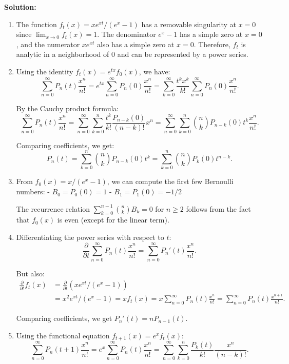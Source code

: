 \bigskip\noindent\textbf{Solution:}
\begin{enumerate}[label=(\alph*)]
\item The function \( f_t(x) = xe^{xt}/(e^x - 1) \) has a removable singularity at \( x = 0 \) since \( \lim_{x \to 0} f_t(x) = 1 \). The denominator \( e^x - 1 \) has a simple zero at \( x = 0 \), and the numerator \( xe^{xt} \) also has a simple zero at \( x = 0 \). Therefore, \( f_t \) is analytic in a neighborhood of 0 and can be represented by a power series.

\item Using the identity \( f_t(x) = e^{tx} f_0(x) \), we have:
\[\sum_{n=0}^\infty P_n(t) \frac{x^n}{n!} = e^{tx} \sum_{n=0}^\infty P_n(0) \frac{x^n}{n!} = \sum_{k=0}^\infty \frac{t^k x^k}{k!} \sum_{n=0}^\infty P_n(0) \frac{x^n}{n!}.\]

By the Cauchy product formula:
\[\sum_{n=0}^\infty P_n(t) \frac{x^n}{n!} = \sum_{n=0}^\infty \sum_{k=0}^n \frac{t^k}{k!} \frac{P_{n-k}(0)}{(n-k)!} x^n = \sum_{n=0}^\infty \sum_{k=0}^n \binom{n}{k} P_{n-k}(0) t^k \frac{x^n}{n!}.\]

Comparing coefficients, we get:
\[P_n(t) = \sum_{k=0}^n \binom{n}{k} P_{n-k}(0) t^k = \sum_{k=0}^n \binom{n}{k} P_k(0) t^{n-k}.\]

\item From \( f_0(x) = x/(e^x - 1) \), we can compute the first few Bernoulli numbers:
- \( B_0 = P_0(0) = 1 \)
- \( B_1 = P_1(0) = -1/2 \)

The recurrence relation \( \sum_{k=0}^{n-1} \binom{n}{k} B_k = 0 \) for \( n \geq 2 \) follows from the fact that \( f_0(x) \) is even (except for the linear term).

\item Differentiating the power series with respect to \( t \):
\[\frac{\partial}{\partial t} \sum_{n=0}^\infty P_n(t) \frac{x^n}{n!} = \sum_{n=0}^\infty P_n'(t) \frac{x^n}{n!}.\]

But also:
\begin{align*}
\frac{\partial}{\partial t} f_t(x) &= \frac{\partial}{\partial t} (xe^{xt}/(e^x - 1)) \\
&= x^2 e^{xt}/(e^x - 1) = x f_t(x) = x \sum_{n=0}^\infty P_n(t) \frac{x^n}{n!} = \sum_{n=0}^\infty P_n(t) \frac{x^{n+1}}{n!}.
\end{align*}

Comparing coefficients, we get \( P_n'(t) = nP_{n-1}(t) \).

\item Using the functional equation \( f_{t+1}(x) = e^x f_t(x) \):
\[\sum_{n=0}^\infty P_n(t+1) \frac{x^n}{n!} = e^x \sum_{n=0}^\infty P_n(t) \frac{x^n}{n!} = \sum_{n=0}^\infty \sum_{k=0}^n \frac{P_k(t)}{k!} \frac{x^n}{(n-k)!}.\]


\end{enumerate}
